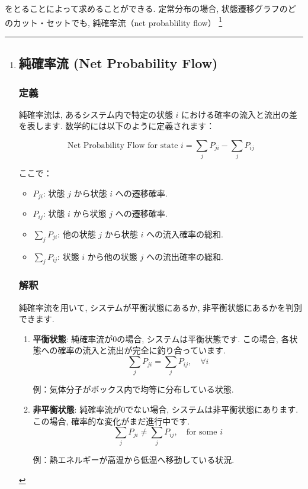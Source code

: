 \documentclass[a4j]{jsarticle}
\begin{document}
をとることによって求めることができる. 定常分布の場合, 状態遷移グラフのどのカット・セットでも, 純確率流（net probablility flow）
\footnote{

	\subsection*{純確率流 (Net Probability Flow)}

	\subsubsection*{定義}
	純確率流は, あるシステム内で特定の状態 \(i\) における確率の流入と流出の差を表します.
	数学的には以下のように定義されます：

	\[
		\text{Net Probability Flow for state } i = \sum_{j} P_{ji} - \sum_{j} P_{ij}
	\]

	ここで：
	\begin{itemize}
		\item \(P_{ji}\): 状態 \(j\) から状態 \(i\) への遷移確率.
		\item \(P_{ij}\): 状態 \(i\) から状態 \(j\) への遷移確率.
		\item \(\sum_{j} P_{ji}\): 他の状態 \(j\) から状態 \(i\) への流入確率の総和.
		\item \(\sum_{j} P_{ij}\): 状態 \(i\) から他の状態 \(j\) への流出確率の総和.
	\end{itemize}

	\subsubsection*{解釈}
	純確率流を用いて, システムが平衡状態にあるか, 非平衡状態にあるかを判別できます.

	\begin{enumerate}
		\item \textbf{平衡状態}:
		      純確率流が0の場合, システムは平衡状態です. この場合, 各状態への確率の流入と流出が完全に釣り合っています.
		      \[
			      \sum_{j} P_{ji} = \sum_{j} P_{ij}, \quad \forall i
		      \]

		      例：気体分子がボックス内で均等に分布している状態.

		\item \textbf{非平衡状態}:
		      純確率流が0でない場合, システムは非平衡状態にあります. この場合, 確率的な変化がまだ進行中です.
		      \[
			      \sum_{j} P_{ji} \neq \sum_{j} P_{ij}, \quad \text{for some } i
		      \]

		      例：熱エネルギーが高温から低温へ移動している状況.
	\end{enumerate}

}
\end{document}
